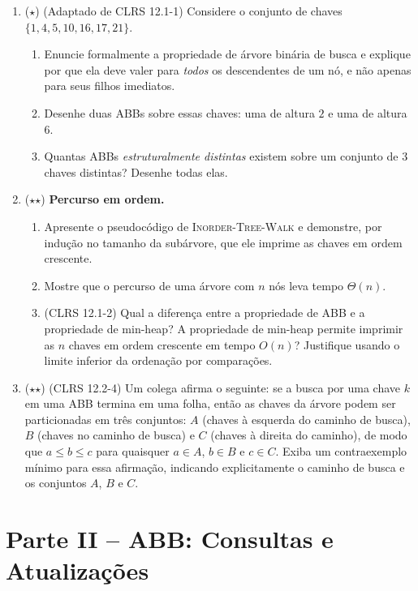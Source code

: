 \documentclass[10pt,a4paper]{extarticle}
\newcommand{\impt}[1]{\textcolor{important}{#1}}
\newcommand{\ntc}[1]{\textcolor{notice}{#1}}
\begin{document}
\begin{enumerate}[label=\textbf{\arabic*.}, leftmargin=*]

\item \ntc{($\star$)} (Adaptado de CLRS 12.1-1) Considere o conjunto de chaves $\{1, 4, 5, 10, 16, 17, 21\}$.
  \begin{enumerate}[label=(\alph*)]
    \item Enuncie formalmente a \impt{propriedade de árvore binária de busca} e explique por que ela deve valer para \emph{todos} os descendentes de um nó, e não apenas para seus filhos imediatos.
    \item Desenhe duas ABBs sobre essas chaves: uma de altura $2$ e uma de altura $6$.
    \item Quantas ABBs \emph{estruturalmente distintas} existem sobre um conjunto de $3$ chaves distintas? Desenhe todas elas.
  \end{enumerate}

\item \ntc{($\star$$\star$)} \textbf{Percurso em ordem.}
  \begin{enumerate}[label=(\alph*)]
    \item Apresente o pseudocódigo de \textsc{Inorder-Tree-Walk} e demonstre, por indução no tamanho da subárvore, que ele imprime as chaves em ordem crescente.
    \item Mostre que o percurso de uma árvore com $n$ nós leva tempo $\Theta(n)$.
    \item (CLRS 12.1-2) Qual a diferença entre a propriedade de ABB e a propriedade de \impt{min-heap}? A propriedade de min-heap permite imprimir as $n$ chaves em ordem crescente em tempo $O(n)$? Justifique usando o limite inferior da ordenação por comparações.
  \end{enumerate}

\item \ntc{($\star$$\star$)} (CLRS 12.2-4) Um colega afirma o seguinte: se a busca por uma chave $k$ em uma ABB termina em uma folha, então as chaves da árvore podem ser particionadas em três conjuntos: $A$ (chaves à esquerda do caminho de busca), $B$ (chaves no caminho de busca) e $C$ (chaves à direita do caminho), de modo que $a \le b \le c$ para quaisquer $a \in A$, $b \in B$ e $c \in C$. Exiba um \impt{contraexemplo mínimo} para essa afirmação, indicando explicitamente o caminho de busca e os conjuntos $A$, $B$ e $C$.

\end{enumerate}

\section*{Parte II -- ABB: Consultas e Atualizações}
\end{document}
